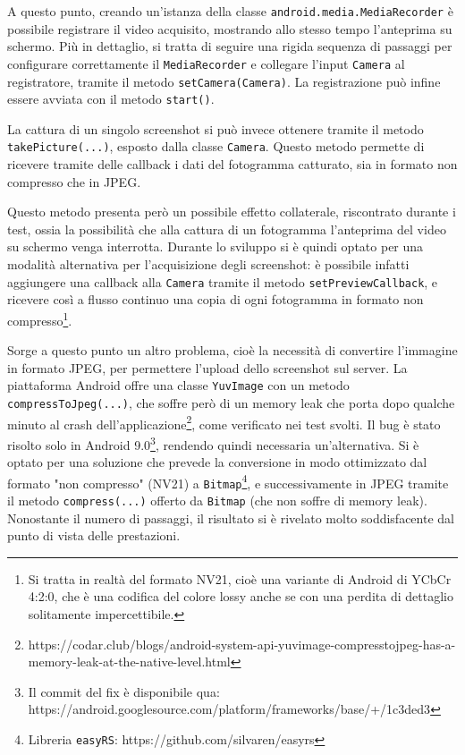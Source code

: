 A questo punto, creando un'istanza della classe \texttt{android.media.MediaRecorder} è possibile registrare il video acquisito, mostrando allo stesso tempo l'anteprima su schermo. Più in dettaglio, si tratta di seguire una rigida sequenza di passaggi\footnotemark{} per configurare correttamente il \texttt{MediaRecorder} e collegare l'input \texttt{Camera} al registratore, tramite il metodo \texttt{setCamera(Camera)}. La registrazione può infine essere avviata con il metodo \texttt{start()}.


La cattura di un singolo screenshot si può invece ottenere tramite il metodo \texttt{takePicture(...)}, esposto dalla classe \texttt{Camera}. Questo metodo permette di ricevere tramite delle callback i dati del fotogramma catturato, sia in formato non compresso che in JPEG.

Questo metodo presenta però un possibile effetto collaterale, riscontrato durante i test, ossia la possibilità che alla cattura di un fotogramma l'anteprima del video su schermo venga interrotta. Durante lo sviluppo si è quindi optato per una modalità alternativa per l'acquisizione degli screenshot: è possibile infatti aggiungere una callback alla \texttt{Camera} tramite il metodo \texttt{setPreviewCallback}, e ricevere così a flusso continuo una copia di ogni fotogramma in formato non compresso\footnote{Si tratta in realtà del formato NV21, cioè una variante di Android di YCbCr 4:2:0, che è una codifica del colore lossy anche se con una perdita di dettaglio solitamente impercettibile.}.

Sorge a questo punto un altro problema, cioè la necessità di convertire l'immagine in formato JPEG, per permettere l'upload dello screenshot sul server. La piattaforma Android offre una classe \texttt{YuvImage} con un metodo \texttt{compressToJpeg(...)}, che soffre però di un memory leak che porta dopo qualche minuto al crash dell'applicazione\footnote{https://codar.club/blogs/android-system-api-yuvimage-compresstojpeg-has-a-memory-leak-at-the-native-level.html}, come verificato nei test svolti. Il bug è stato risolto solo in Android 9.0\footnote{Il commit del fix è disponibile qua: https://android.googlesource.com/platform/frameworks/base/+/1c3ded3}, rendendo quindi necessaria un'alternativa. Si è optato per una soluzione che prevede la conversione in modo ottimizzato dal formato "non compresso" (NV21) a \texttt{Bitmap}\footnote{Libreria \texttt{easyRS}: https://github.com/silvaren/easyrs}, e successivamente in JPEG tramite il metodo \texttt{compress(...)} offerto da \texttt{Bitmap} (che non soffre di memory leak). Nonostante il numero di passaggi, il risultato si è rivelato molto soddisfacente dal punto di vista delle prestazioni.

